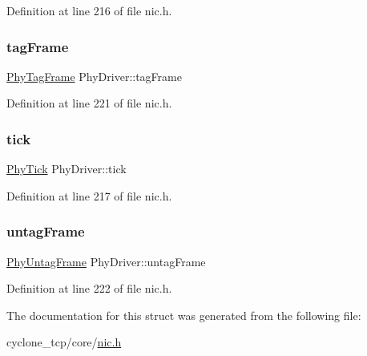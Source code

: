 Definition at line 216 of file nic.\+h.

\mbox{\label{structPhyDriver_a2306f5493d01b01ade8b74946f15c063}} 
\subsubsection{\texorpdfstring{tag\+Frame}{tagFrame}}
{\footnotesize\ttfamily \hyperlink{nic_8h_a85c4a163fe96d6cdaab0e5545369e233}{Phy\+Tag\+Frame} Phy\+Driver\+::tag\+Frame}



Definition at line 221 of file nic.\+h.

\mbox{\label{structPhyDriver_af65e9345208a582544bf2bac64a9ab5c}} 
\subsubsection{\texorpdfstring{tick}{tick}}
{\footnotesize\ttfamily \hyperlink{nic_8h_ab684b8c15e030cb47dc256480325a732}{Phy\+Tick} Phy\+Driver\+::tick}



Definition at line 217 of file nic.\+h.

\mbox{\label{structPhyDriver_a9469eaf3ce26cdf723bd7dba3e191877}} 
\subsubsection{\texorpdfstring{untag\+Frame}{untagFrame}}
{\footnotesize\ttfamily \hyperlink{nic_8h_a4f423898a5e094db0fbcc5b7732a3cb9}{Phy\+Untag\+Frame} Phy\+Driver\+::untag\+Frame}



Definition at line 222 of file nic.\+h.



The documentation for this struct was generated from the following file\+:\begin{DoxyCompactItemize}
\item 
cyclone\+\_\+tcp/core/\hyperlink{nic_8h}{nic.\+h}\end{DoxyCompactItemize}
